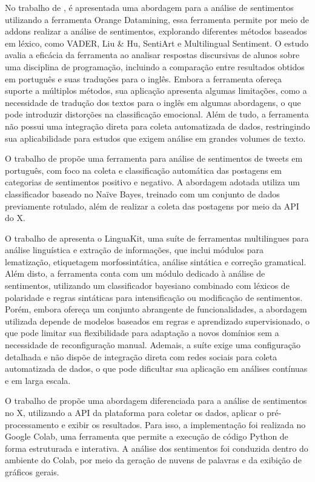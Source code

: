 \documentclass[
	12pt,				%
	oneside,			%
	a4paper,			%
	english,			%
	french,				%
	spanish,			%
	brazil				%
	]{abntex2}
\begin{document}
No trabalho de , é apresentada uma
abordagem para a análise de sentimentos utilizando a ferramenta Orange
Datamining, essa ferramenta permite por meio de addons realizar a
análise de sentimentos, explorando diferentes métodos baseados em
léxico, como VADER, Liu \& Hu, SentiArt e Multilingual Sentiment. O
estudo avalia a eficácia da ferramenta ao analisar respostas discursivas
de alunos sobre uma disciplina de programação, incluindo a comparação
entre resultados obtidos em português e suas traduções para o inglês.
Embora a ferramenta ofereça suporte a múltiplos métodos, sua aplicação
apresenta algumas limitações, como a necessidade de tradução dos textos
para o inglês em algumas abordagens, o que pode introduzir distorções na
classificação emocional. Além de tudo, a ferramenta não possui uma
integração direta para coleta automatizada de dados, restringindo sua
aplicabilidade para estudos que exigem análise em grandes volumes de
texto.

O trabalho de  propõe uma ferramenta para
análise de sentimentos de tweets em português, com foco na coleta e
classificação automática das postagens em categorias de sentimentos
positivo e negativo. A abordagem adotada utiliza um classificador
baseado no Naïve Bayes, treinado com um conjunto de dados previamente
rotulado, além de realizar a coleta das postagens por meio da API do X.

O trabalho de  apresenta o LinguaKit,
uma suíte de ferramentas multilingues para análise linguística e
extração de informações, que inclui módulos para lematização,
etiquetagem morfossintática, análise sintática e correção gramatical.
Além disto, a ferramenta conta com um módulo dedicado à análise de
sentimentos, utilizando um classificador bayesiano combinado com léxicos
de polaridade e regras sintáticas para intensificação ou modificação de
sentimentos. Porém, embora ofereça um conjunto abrangente de
funcionalidades, a abordagem utilizada depende de modelos baseados em
regras e aprendizado supervisionado, o que pode limitar sua
flexibilidade para adaptação a novos domínios sem a necessidade de
reconfiguração manual. Ademais, a suíte exige uma configuração detalhada
e não dispõe de integração direta com redes sociais para coleta
automatizada de dados, o que pode dificultar sua aplicação em análises
contínuas e em larga escala.

O trabalho de  propõe uma abordagem diferenciada
para a análise de sentimentos no X, utilizando a API da plataforma para
coletar os dados, aplicar o pré-processamento e exibir os resultados.
Para isso, a implementação foi realizada no Google Colab, uma ferramenta
que permite a execução de código Python de forma estruturada e
interativa. A análise dos sentimentos foi conduzida dentro do ambiente
do Colab, por meio da geração de nuvens de palavras e da exibição de
gráficos gerais.
\end{document}
